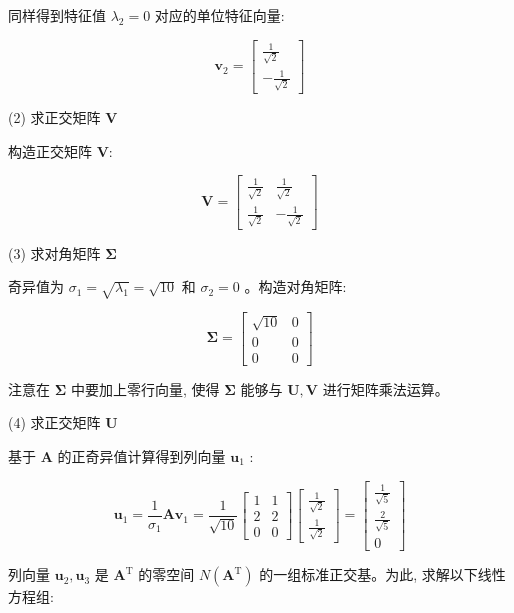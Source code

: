\documentclass[10pt]{article}
\begin{document}
同样得到特征值 $\lambda_{2}=0$ 对应的单位特征向量:

$$
\boldsymbol{v}_{2}=\left[\begin{array}{c}
\frac{1}{\sqrt{2}} \\
-\frac{1}{\sqrt{2}}
\end{array}\right]
$$

(2) 求正交矩阵 $\boldsymbol{V}$

构造正交矩阵 $\boldsymbol{V}:$

$$
\boldsymbol{V}=\left[\begin{array}{cc}
\frac{1}{\sqrt{2}} & \frac{1}{\sqrt{2}} \\
\frac{1}{\sqrt{2}} & -\frac{1}{\sqrt{2}}
\end{array}\right]
$$

(3) 求对角矩阵 $\boldsymbol{\Sigma}$

奇异值为 $\sigma_{1}=\sqrt{\lambda_{1}}=\sqrt{10}$ 和 $\sigma_{2}=0$ 。构造对角矩阵:

$$
\boldsymbol{\Sigma}=\left[\begin{array}{cc}
\sqrt{10} & 0 \\
0 & 0 \\
0 & 0
\end{array}\right]
$$

注意在 $\boldsymbol{\Sigma}$ 中要加上零行向量, 使得 $\boldsymbol{\Sigma}$ 能够与 $\boldsymbol{U}, \boldsymbol{V}$ 进行矩阵乘法运算。

(4) 求正交矩阵 $\boldsymbol{U}$

基于 $\boldsymbol{A}$ 的正奇异值计算得到列向量 $\boldsymbol{u}_{1}$ :

$$
\boldsymbol{u}_{1}=\frac{1}{\sigma_{1}} \boldsymbol{A} \boldsymbol{v}_{1}=\frac{1}{\sqrt{10}}\left[\begin{array}{ll}
1 & 1 \\
2 & 2 \\
0 & 0
\end{array}\right]\left[\begin{array}{c}
\frac{1}{\sqrt{2}} \\
\frac{1}{\sqrt{2}}
\end{array}\right]=\left[\begin{array}{c}
\frac{1}{\sqrt{5}} \\
\frac{2}{\sqrt{5}} \\
0
\end{array}\right]
$$

列向量 $\boldsymbol{u}_{2}, \boldsymbol{u}_{3}$ 是 $\boldsymbol{A}^{\mathrm{T}}$ 的零空间 $N\left(\boldsymbol{A}^{\mathrm{T}}\right)$ 的一组标准正交基。为此, 求解以下线性方程组:
\end{document}
